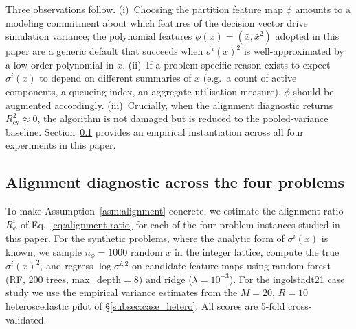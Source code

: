 \begin{remark}\label{rem:alignment-practical}
  Three observations follow.  (i)~Choosing the partition feature map
  $\phi$ amounts to a modeling commitment about which features of the
  decision vector drive simulation variance; the polynomial features
  $\phi(x)=(\bar x,\bar x^2)$ adopted in this paper are a generic default
  that succeeds when $\sigma^{i}(x)^{2}$ is well-approximated by a low-order
  polynomial in $x$.  (ii)~If a problem-specific reason exists to expect
  $\sigma^{i}(x)$ to depend on different summaries of $x$ (e.g.\ a count
  of active components, a queueing index, an aggregate utilisation
  measure), $\phi$ should be augmented accordingly.  (iii)~Crucially,
  when the alignment diagnostic returns
  $R^{2}_{\mathrm{cv}}\approx 0$, the algorithm is not damaged but is
  reduced to the pooled-variance baseline.  Section~\ref{subsec:alignment-diag}
  provides an empirical instantiation across all four experiments in this
  paper.
\end{remark}



\subsection{Alignment diagnostic across the four problems}
\label{subsec:alignment-diag}

To make Assumption~\ref{asm:alignment} concrete, we estimate the
alignment ratio $R_\phi^i$ of Eq.~\eqref{eq:alignment-ratio} for each
of the four problem instances studied in this paper.  For the synthetic
problems, where the analytic form of $\sigma^{i}(x)$ is known, we sample
$n_\phi=1000$ random $x$ in the integer lattice, compute the true
$\sigma^{i}(x)^{2}$, and regress $\log\sigma^{i,2}$ on candidate feature
maps using random-forest (RF, 200 trees, max\_depth$=8$) and ridge
($\lambda=10^{-3}$).  For the ingolstadt21 case study we use the
empirical variance estimates from the $M=20$, $R=10$ heteroscedastic
pilot of \S\ref{subsec:case_hetero}.  All scores are 5-fold cross-validated.

